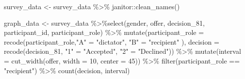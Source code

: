 \documentclass[
  letterpaper,
]{book}
\newenvironment{Shaded}{\begin{snugshade}}{\end{snugshade}}
\newcommand{\AttributeTok}[1]{\textcolor[rgb]{0.40,0.45,0.13}{#1}}
\newcommand{\DecValTok}[1]{\textcolor[rgb]{0.68,0.00,0.00}{#1}}
\newcommand{\FunctionTok}[1]{\textcolor[rgb]{0.28,0.35,0.67}{#1}}
\newcommand{\NormalTok}[1]{\textcolor[rgb]{0.00,0.23,0.31}{#1}}
\newcommand{\OtherTok}[1]{\textcolor[rgb]{0.00,0.23,0.31}{#1}}
\newcommand{\SpecialCharTok}[1]{\textcolor[rgb]{0.37,0.37,0.37}{#1}}
\newcommand{\StringTok}[1]{\textcolor[rgb]{0.13,0.47,0.30}{#1}}
\begin{document}
\begin{Shaded}
\begin{Highlighting}[]
\NormalTok{survey\_data }\OtherTok{\textless{}{-}}\NormalTok{ survey\_data }\SpecialCharTok{\%\textgreater{}\%}\NormalTok{ janitor}\SpecialCharTok{::}\FunctionTok{clean\_names}\NormalTok{()}

\NormalTok{graph\_data }\OtherTok{\textless{}{-}}\NormalTok{ survey\_data }\SpecialCharTok{\%\textgreater{}\%}\FunctionTok{select}\NormalTok{(gender, offer,  decision\_81, participant\_id, participant\_role) }\SpecialCharTok{\%\textgreater{}\%} 
  \FunctionTok{mutate}\NormalTok{(}\AttributeTok{participant\_role =} \FunctionTok{recode}\NormalTok{(participant\_role,}\StringTok{"A"} \OtherTok{=} \StringTok{"dictator"}\NormalTok{, }\StringTok{"B"} \OtherTok{=} \StringTok{"recipient"}\NormalTok{ ),}
         \AttributeTok{decision =} \FunctionTok{recode}\NormalTok{(decision\_81, }\StringTok{"1"} \OtherTok{=} \StringTok{"Accepted"}\NormalTok{, }\StringTok{"2"} \OtherTok{=} \StringTok{"Declined"}\NormalTok{)) }\SpecialCharTok{\%\textgreater{}\%} 
  \FunctionTok{mutate}\NormalTok{(}\AttributeTok{interval =} \FunctionTok{cut\_width}\NormalTok{(offer, }\AttributeTok{width =} \DecValTok{10}\NormalTok{, }\AttributeTok{center =} \DecValTok{45}\NormalTok{)) }\SpecialCharTok{\%\textgreater{}\%}
  \FunctionTok{filter}\NormalTok{(participant\_role }\SpecialCharTok{==} \StringTok{"recipient"}\NormalTok{) }\SpecialCharTok{\%\textgreater{}\%} \FunctionTok{count}\NormalTok{(decision, interval) }
\end{Highlighting}
\end{Shaded}

\begin{Shaded}
\end{Shaded}
\end{document}
